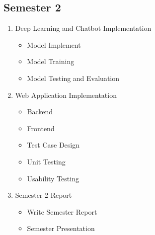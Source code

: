 \documentclass[12pt,oneside,openright,a4paper]{cpe-english-project}
\begin{document}
    \subsection{Semester 2}
      \begin{enumerate}
        \item Deep Learning and Chatbot Implementation
          \begin{itemize}
            \item Model Implement
            \item Model Training
            \item Model Testing and Evaluation
          \end{itemize}
        \item Web Application Implementation
          \begin{itemize}
            \item Backend
            \item Frontend
            \item Test Case Design
            \item Unit Testing
            \item Usability Testing
          \end{itemize}
        \item Semester 2 Report
          \begin{itemize}
            \item Write Semester Report
            \item Semester Presentation
          \end{itemize}
      \end{enumerate}
\end{document}

